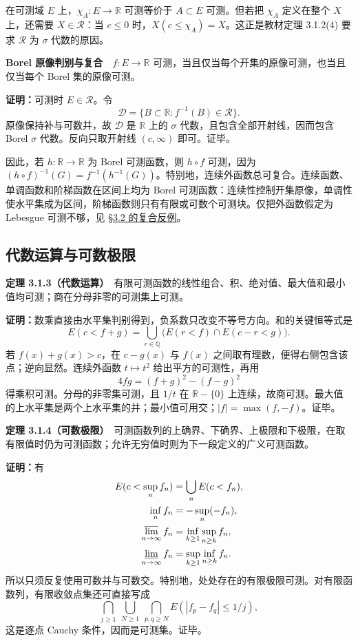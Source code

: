 \documentclass[11pt,a4paper]{article}
\begin{document}
在可测域 \(E\) 上，\(\chi_A:E\to\mathbb R\) 可测等价于 \(A\subset E\)
可测。但若把 \(\chi_A\) 定义在整个 \(X\) 上，还需要
\(X\in\mathcal R\)：当 \(c\le0\) 时，\(X(c\le\chi_A)=X\)。这正是教材定理
3.1.2(4) 要求 \(\mathcal R\) 为 \(\sigma\) 代数的原因。

\textbf{Borel 原像判别与复合}　\(f:E\to\mathbb R\)
可测，当且仅当每个开集的原像可测，也当且仅当每个 Borel 集的原像可测。

\textbf{证明：}可测时 \(E\in\mathcal R\)。令 \[
\mathcal D=\{B\subset\mathbb R:f^{-1}(B)\in\mathcal R\}.
\] 原像保持补与可数并，故 \(\mathcal D\) 是 \(\mathbb R\) 上的
\(\sigma\) 代数，且包含全部开射线，因而包含 Borel \(\sigma\)
代数。反向只取开射线 \((c,\infty)\) 即可。证毕。

因此，若 \(h:\mathbb R\to\mathbb R\) 为 Borel 可测函数，则 \(h\circ f\)
可测，因为
\((h\circ f)^{-1}(G)=f^{-1}(h^{-1}(G))\)。特别地，连续外函数总可复合。连续函数、单调函数和阶梯函数在区间上均为
Borel
可测函数：连续性控制开集原像，单调性使水平集成为区间，阶梯函数则只有有限或可数个可测块。仅把外函数假定为
Lebesgue 可测不够，见
\href{https://zj139.github.io/math-notes/notes/1f3a19ea67c736860ad6ef85/\#复合的方向不能颠倒}{§3.2
的复合反例}。

\subsection*{代数运算与可数极限}\label{ux4ee3ux6570ux8fd0ux7b97ux4e0eux53efux6570ux6781ux9650}

\textbf{定理
3.1.3（代数运算）}　有限可测函数的线性组合、积、绝对值、最大值和最小值均可测；商在分母非零的可测集上可测。

\textbf{证明：}数乘直接由水平集判别得到，负系数只改变不等号方向。和的关键恒等式是
\[
E(c<f+g)=\bigcup_{r\in\mathbb Q}
\bigl(E(r<f)\cap E(c-r<g)\bigr).
\] 若 \(f(x)+g(x)>c\)，在 \(c-g(x)\) 与 \(f(x)\)
之间取有理数，便得右侧包含该点；逆向显然。连续外函数 \(t\mapsto t^2\)
给出平方的可测性，再用 \[
4fg=(f+g)^2-(f-g)^2
\] 得乘积可测。分母的非零集可测，且 \(1/t\) 在 \(\mathbb R-\{0\}\)
上连续，故商可测。最大值的上水平集是两个上水平集的并；最小值可用交；\(|f|=\max(f,-f)\)。证毕。

\textbf{定理
3.1.4（可数极限）}　可测函数列的上确界、下确界、上极限和下极限，在取有限值时仍为可测函数；允许无穷值时则为下一段定义的广义可测函数。

\textbf{证明：}有 \[
\begin{aligned}
E(c<\sup_n f_n)&=\bigcup_n E(c<f_n),\\
\inf_n f_n&=-\sup_n(-f_n),\\
\varlimsup_{n\to\infty}f_n&=\inf_{k\ge1}\sup_{n\ge k}f_n,\\
\varliminf_{n\to\infty}f_n&=\sup_{k\ge1}\inf_{n\ge k}f_n.
\end{aligned}
\]
所以只须反复使用可数并与可数交。特别地，处处存在的有限极限可测。对有限函数列，有限收敛点集还可直接写成
\[
\bigcap_{j\ge1}\ \bigcup_{N\ge1}\ \bigcap_{p,q\ge N}
E(|f_p-f_q|\le1/j),
\] 这是逐点 Cauchy 条件，因而是可测集。证毕。
\end{document}
